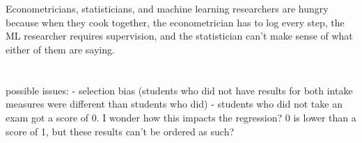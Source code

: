 \documentclass{article}
\begin{document}
\setcounter{section}{10}
\section{}
Econometricians, statisticians, and machine learning researchers are hungry because when they cook together, the econometrician has to log every step, the ML researcher requires supervision, and the statistician can't make sense of what either of them are saying.


\section{}
possible issues:
- selection bias (students who did not have results for both intake measures were different than students who did)
- students who did not take an exam got a score of 0. I wonder how this impacts the regression? 0 is lower than a score of 1, but these results can't be ordered as such?
\end{document}
